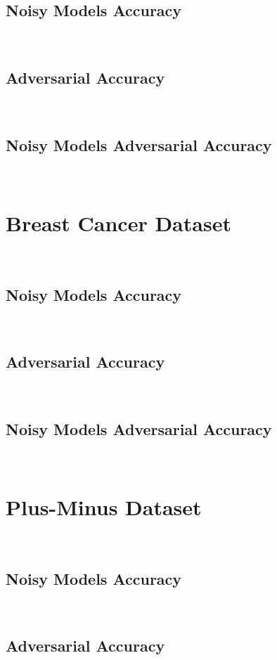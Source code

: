 \subsection{Noisy Models Accuracy}\label{subsection:diabetes-noisy-acc} \

\subsection{Adversarial Accuracy}\label{subsection:diabetes-adv-acc} \

\subsection{Noisy Models Adversarial Accuracy}\label{subsection:diabetes-noisy-adv-acc} \

\section{Breast Cancer Dataset}\label{section:breast-cancer-eval} \

\subsection{Noisy Models Accuracy}\label{subsection:breast-cancer-noisy-acc} \

\subsection{Adversarial Accuracy}\label{subsection:breast-cancer-adv-acc} \

\subsection{Noisy Models Adversarial Accuracy}\label{subsection:breast-cancer-noisy-adv-acc} \

\section{Plus-Minus Dataset}\label{section:plus-minus-eval} \

\subsection{Noisy Models Accuracy}\label{subsection:plus-minus-noisy-acc} \

\subsection{Adversarial Accuracy}\label{subsection:plus-minus-adv-acc} \

